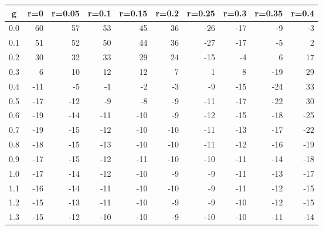 %
\begin{table}[!tbp]
 \begin{center}
 \begin{tabular}{rrrrrrrrrr}\hline\hline
\multicolumn{1}{c}{g}&\multicolumn{1}{c}{r=0}&\multicolumn{1}{c}{r=0.05}&\multicolumn{1}{c}{r=0.1}&\multicolumn{1}{c}{r=0.15}&\multicolumn{1}{c}{r=0.2}&\multicolumn{1}{c}{r=0.25}&\multicolumn{1}{c}{r=0.3}&\multicolumn{1}{c}{r=0.35}&\multicolumn{1}{c}{r=0.4}\tabularnewline
\hline
0.0& 60& 57& 53& 45& 36&-26&-17& -9& -3\tabularnewline
0.1& 51& 52& 50& 44& 36&-27&-17& -5&  2\tabularnewline
0.2& 30& 32& 33& 29& 24&-15& -4&  6& 17\tabularnewline
0.3&  6& 10& 12& 12&  7&  1&  8&-19& 29\tabularnewline
0.4&-11& -5& -1& -2& -3& -9&-15&-24& 33\tabularnewline
0.5&-17&-12& -9& -8& -9&-11&-17&-22& 30\tabularnewline
0.6&-19&-14&-11&-10& -9&-12&-15&-18&-25\tabularnewline
0.7&-19&-15&-12&-10&-10&-11&-13&-17&-22\tabularnewline
0.8&-18&-15&-13&-10&-10&-11&-12&-16&-19\tabularnewline
0.9&-17&-15&-12&-11&-10&-10&-11&-14&-18\tabularnewline
1.0&-17&-14&-12&-10& -9& -9&-11&-13&-17\tabularnewline
1.1&-16&-14&-11&-10&-10& -9&-11&-12&-15\tabularnewline
1.2&-15&-13&-11&-10& -9& -9&-10&-12&-15\tabularnewline
1.3&-15&-12&-10&-10& -9&-10&-10&-11&-14\tabularnewline
\hline
\end{tabular}

\end{center}

\end{table}

